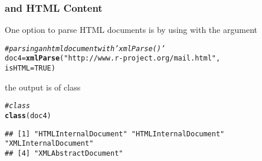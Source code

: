 \documentclass[12pt]{beamer}\usepackage[]{graphicx}\usepackage[]{color}
\makeatletter
\newcommand{\hlnum}[1]{\textcolor[rgb]{0.686,0.059,0.569}{#1}}%
\newcommand{\hlstr}[1]{\textcolor[rgb]{0.192,0.494,0.8}{#1}}%
\newcommand{\hlcom}[1]{\textcolor[rgb]{0.678,0.584,0.686}{\textit{#1}}}%
\newcommand{\hlstd}[1]{\textcolor[rgb]{0.345,0.345,0.345}{#1}}%
\newcommand{\hlkwb}[1]{\textcolor[rgb]{0.69,0.353,0.396}{#1}}%
\newcommand{\hlkwc}[1]{\textcolor[rgb]{0.333,0.667,0.333}{#1}}%
\newcommand{\hlkwd}[1]{\textcolor[rgb]{0.737,0.353,0.396}{\textbf{#1}}}%
\newenvironment{kframe}{%
 \def\at@end@of@kframe{}%
 \ifinner\ifhmode%
  \def\at@end@of@kframe{\end{minipage}}%
  \begin{minipage}{\columnwidth}%
 \fi\fi%
 \def\FrameCommand##1{\hskip\@totalleftmargin \hskip-\fboxsep
 \colorbox{shadecolor}{##1}\hskip-\fboxsep
     \hskip-\linewidth \hskip-\@totalleftmargin \hskip\columnwidth}%
 \MakeFramed {\advance\hsize-\width
   \@totalleftmargin\z@ \linewidth\hsize
   \@setminipage}}%
 {\par\unskip\endMakeFramed%
 \at@end@of@kframe}
\newenvironment{knitrout}{}{} %
\makeatother
\begin{document}

\begin{frame}[fragile]
\frametitle{ and HTML Content}

One option to parse HTML documents is by using  with the argument {\hilit {}}

\begin{knitrout}\footnotesize
{}\color{fgcolor}\begin{kframe}
\begin{alltt}
\hlcom{# parsing an html document with 'xmlParse()'}
\hlstd{doc4} \hlkwb{=} \hlkwd{xmlParse}\hlstd{(}\hlstr{"http://www.r-project.org/mail.html"}\hlstd{,}
                \hlkwc{isHTML} \hlstd{=} \hlnum{TRUE}\hlstd{)}
\end{alltt}
\end{kframe}
\end{knitrout}

the output is of class {\hilit {}}



\begin{knitrout}\footnotesize
{}\color{fgcolor}\begin{kframe}
\begin{alltt}
\hlcom{# class }
\hlkwd{class}\hlstd{(doc4)}
\end{alltt}
\begin{verbatim}
## [1] "HTMLInternalDocument" "HTMLInternalDocument" "XMLInternalDocument" 
## [4] "XMLAbstractDocument"
\end{verbatim}
\end{kframe}
\end{knitrout}
\eb

\end{frame}

\end{document}
